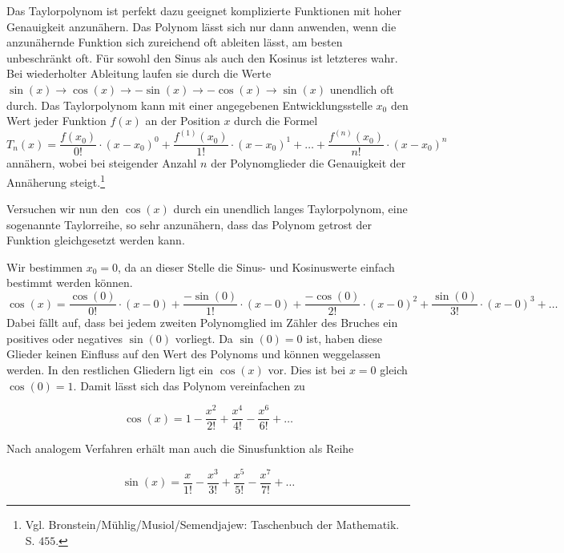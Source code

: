 \documentclass[a4paper,12pt]{article} %
\begin{document}
Das Taylorpolynom ist perfekt dazu geeignet komplizierte Funktionen mit hoher Genauigkeit anzunähern.
Das Polynom lässt sich nur dann anwenden, wenn die anzunähernde Funktion sich zureichend oft ableiten lässt, am besten unbeschränkt oft.
Für sowohl den Sinus als auch den Kosinus ist letzteres wahr.
Bei wiederholter Ableitung laufen sie durch die Werte $\sin(x) \rightarrow \cos(x) \rightarrow -\sin(x) \rightarrow -\cos(x) \rightarrow \sin(x)$ unendlich oft durch.
Das Taylorpolynom kann mit einer angegebenen Entwicklungsstelle $x_0$ den Wert jeder Funktion $f(x)$ an der Position $x$ durch die Formel
\begin{equation}
	T_n(x)=\frac{f(x_0)}{0!}\cdot(x-x_0)^0 + \frac{f^{(1)}(x_0)}{1!}\cdot(x-x_0)^1 +%
	\dots +\frac{f^{(n)}(x_0)}{n!}\cdot(x-x_0)^n
\end{equation} %
annähern, wobei bei steigender Anzahl $n$ der Polynomglieder die Genauigkeit der Annäherung steigt.\footnote{Vgl. Bronstein/Mühlig/Musiol/Semendjajew: Taschenbuch der Mathematik. S. $455$.}


Versuchen wir nun den $\cos(x)$ durch ein unendlich langes Taylorpolynom, eine sogenannte Taylorreihe, so sehr anzunähern, dass das Polynom getrost der Funktion gleichgesetzt werden kann.


Wir bestimmen $x_0=0$, da an dieser Stelle die Sinus- und Kosinuswerte einfach bestimmt werden können.
\[\cos(x)=\frac{\cos(0)}{0!}\cdot(x-0) + \frac{-\sin(0)}{1!}\cdot(x-0) + \frac{-\cos(0)}{2!}\cdot(x-0)^2+\frac{\sin(0)}{3!}\cdot(x-0)^3+\dots\]
Dabei fällt auf, dass bei jedem zweiten Polynomglied im Zähler des Bruches ein positives oder negatives $\sin(0)$ vorliegt.
Da $\sin(0)=0$ ist, haben diese Glieder keinen Einfluss auf den Wert des Polynoms und können weggelassen werden. In den restlichen Gliedern ligt ein $\cos(x)$ vor. Dies ist bei $x=0$ gleich $\cos(0)=1$. Damit lässt sich das Polynom vereinfachen zu

\begin{equation}\label{cos}
	\cos(x)=1-\frac{x^2}{2!}+\frac{x^4}{4!}-\frac{x^6}{6!}+\dots
\end{equation}

Nach analogem Verfahren erhält man auch die Sinusfunktion als Reihe

\begin{equation}\label{sin}
	\sin(x)=\frac{x}{1!}-\frac{x^3}{3!}+\frac{x^5}{5!}-\frac{x^7}{7!}+\dots
\end{equation}
\end{document}
